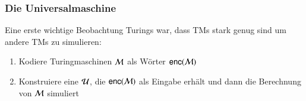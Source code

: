 \documentclass[aspectratio=1610,onlymath]{beamer}
\begin{document}

\begin{frame}\frametitle{Die Universalmaschine}

Eine erste wichtige Beobachtung Turings war, dass TMs stark genug sind um andere TMs zu simulieren:
\bigskip

\begin{enumerate}[{Schritt} 1:]
\item Kodiere Turingmaschinen $\mathcal{M}$ als Wörter $\textsf{enc}(\mathcal{M})$
\item Konstruiere eine  $\mathcal{U}$, die $\textsf{enc}(\mathcal{M})$ als Eingabe erhält und dann die Berechnung von $\mathcal{M}$ simuliert
\end{enumerate}

\end{frame}
\end{document}

